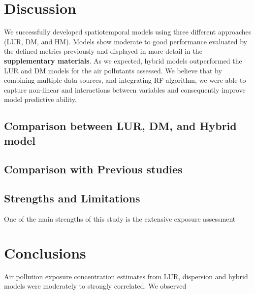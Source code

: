 \documentclass{article}
\begin{document}
\newpage

\section{Discussion}
We successfully developed spatiotemporal models using three different approaches (LUR, DM, and HM). Models show moderate to good performance 
evaluated by the defined metrics previously and displayed in more detail in the \textbf{supplementary materials}. As we expected, hybrid models outperformed the LUR and DM models for the air pollutants assessed. We believe that by combining multiple data sources, and integrating RF algorithm, we were able to capture non-linear and interactions between variables and consequently improve model predictive ability. 

\subsection{Comparison between LUR, DM, and Hybrid model}






\subsection{Comparison with Previous studies}




\subsection{Strengths and Limitations}
One of the main strengths of this study is the extensive exposure assessment 

\section{Conclusions}

Air pollution exposure concentration estimates from LUR, dispersion and hybrid models were moderately to strongly correlated. We observed 



































\newpage


\end{document}
